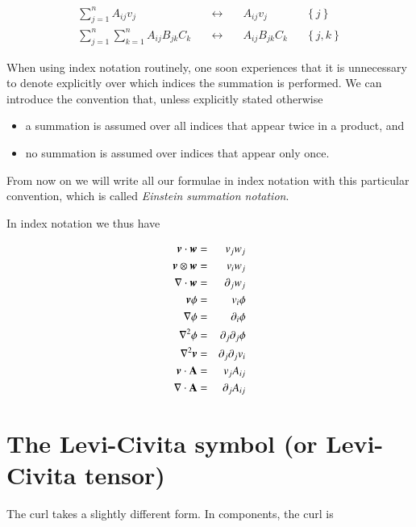 \begin{equation}
\begin{array}{ccccc}
\sum_{j=1}^n A_{ij}v_j &\quad\longleftrightarrow\quad& A_{ij}v_j && \left\{j\right\}\\
\sum_{j=1}^n \sum_{k=1}^n A_{ij}B_{jk} C_{k}   &\quad\longleftrightarrow\quad& A_{ij}B_{jk} C_{k} && \left\{j,k\right\}
\end{array}
\end{equation}


When using index notation routinely, one soon experiences that it is unnecessary to denote explicitly over which indices the summation is performed. We can introduce the convention that, unless explicitly stated otherwise

\begin{itemize}
\item a summation is assumed over all indices that appear twice in a product, and
\item no summation is assumed over indices that appear only once.
\end{itemize}
  
From now on we will write all our formulae in index notation with this
particular convention, which is called  {\it Einstein summation notation}.

In index notation we thus have


\begin{eqnarray}
  {\boldsymbol{v}} \cdot {\boldsymbol{w}} &=& v_j w_j \\
  {\boldsymbol{v}} \otimes {\boldsymbol{w}} &=& v_i w_j \\
\nabla \cdot {\boldsymbol{w}} &=& \partial_j w_j\\ 
{\boldsymbol{v}} \phi &=& v_i \phi \\
\nabla \phi &=& \partial_i \phi\\
\nabla^2\phi  &=& \partial_j\partial_j \phi\\
\nabla^2{\boldsymbol{v}}  &=& \partial_j\partial_j v_i\\
{\boldsymbol{v}}\cdot\boldsymbol{\mathrm{A}} &=& v_jA_{ij}\\
\nabla \cdot \boldsymbol{\mathrm{A}} &=& \partial_j A_{ij}
\end{eqnarray}


\section{The Levi-Civita symbol (or Levi-Civita tensor)}

The curl takes a slightly different form. In components, the curl is  


